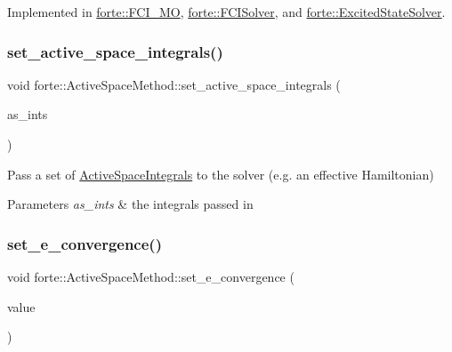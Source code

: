 Implemented in \mbox{\hyperlink{classforte_1_1_f_c_i___m_o_afe4bb6cb53fbf4190c020ee3fa794237}{forte\+::\+F\+C\+I\+\_\+\+MO}}, \mbox{\hyperlink{classforte_1_1_f_c_i_solver_a40d53f62ae73a7baf7560dac37838b8b}{forte\+::\+F\+C\+I\+Solver}}, and \mbox{\hyperlink{classforte_1_1_excited_state_solver_a67a061a196cc9e492fabc1b6c7995409}{forte\+::\+Excited\+State\+Solver}}.

\mbox{\label{classforte_1_1_active_space_method_a68315114ff7ca403e1cf05ad9faaf1d0}} 
\subsubsection{\texorpdfstring{set\+\_\+active\+\_\+space\+\_\+integrals()}{set\_active\_space\_integrals()}}
{\footnotesize\ttfamily void forte\+::\+Active\+Space\+Method\+::set\+\_\+active\+\_\+space\+\_\+integrals (\begin{DoxyParamCaption}\item[{std\+::shared\+\_\+ptr$<$ \mbox{\hyperlink{classforte_1_1_active_space_integrals}{Active\+Space\+Integrals}} $>$}]{as\+\_\+ints }\end{DoxyParamCaption})}

Pass a set of \mbox{\hyperlink{classforte_1_1_active_space_integrals}{Active\+Space\+Integrals}} to the solver (e.\+g. an effective Hamiltonian) 
\begin{DoxyParams}{Parameters}
{\em as\+\_\+ints} & the integrals passed in \\
\hline
\end{DoxyParams}
\mbox{\label{classforte_1_1_active_space_method_ac4f39aa66c9d4481d172ea9e6255dc03}} 
\subsubsection{\texorpdfstring{set\+\_\+e\+\_\+convergence()}{set\_e\_convergence()}}
{\footnotesize\ttfamily void forte\+::\+Active\+Space\+Method\+::set\+\_\+e\+\_\+convergence (\begin{DoxyParamCaption}\item[{double}]{value }\end{DoxyParamCaption})}

